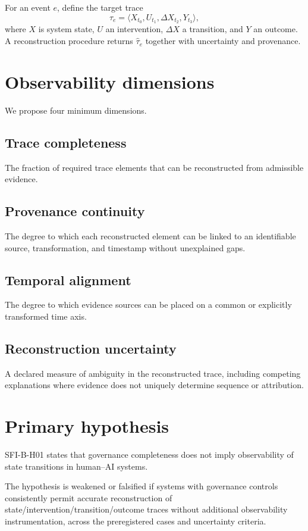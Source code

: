 \documentclass[11pt]{article}
\begin{document}
For an event $e$, define the target trace
\[
\tau_e = \langle X_{t_0},U_{t_1},\Delta X_{t_2},Y_{t_3}\rangle,
\]
where $X$ is system state, $U$ an intervention, $\Delta X$ a transition, and $Y$ an outcome. A reconstruction procedure returns $\hat{\tau}_e$ together with uncertainty and provenance.

\section{Observability dimensions}
We propose four minimum dimensions.

\subsection{Trace completeness}
The fraction of required trace elements that can be reconstructed from admissible evidence.

\subsection{Provenance continuity}
The degree to which each reconstructed element can be linked to an identifiable source, transformation, and timestamp without unexplained gaps.

\subsection{Temporal alignment}
The degree to which evidence sources can be placed on a common or explicitly transformed time axis.

\subsection{Reconstruction uncertainty}
A declared measure of ambiguity in the reconstructed trace, including competing explanations where evidence does not uniquely determine sequence or attribution.

\section{Primary hypothesis}
SFI-B-H01 states that governance completeness does not imply observability of state transitions in human--AI systems.

The hypothesis is weakened or falsified if systems with governance controls consistently permit accurate reconstruction of state/intervention/transition/outcome traces without additional observability instrumentation, across the preregistered cases and uncertainty criteria.
\end{document}
